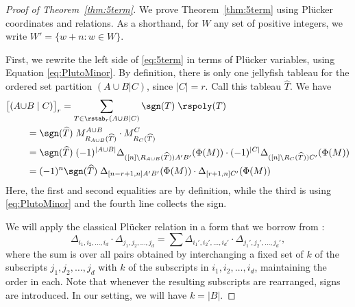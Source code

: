 \begin{proof}[Proof of Theorem~\ref{thm:5term}]
        We prove Theorem~\ref{thm:5term} using Pl\"ucker coordinates and relations. As a shorthand, for $W$ any set of positive integers, we write $W' = \{w + n : w \in W\}$.
        
    First, we rewrite the left side of \eqref{eq:5term} in terms of Pl\"ucker variables, using Equation \eqref{eq:PlutoMinor}.  By definition, there is only one jellyfish tableau for the ordered set partition $(A\cup B | C)$, since $|C|=r$. Call this tableau $\widehat{T}$.
    We have
    \begin{equation}\label{eq:expand_the_jellyfish_inv}
    \begin{split}
            \big[(A\cup & B \mid C)\big]_r = \sum_{T\in \rstab_r(A\cup B \mid C)}\sgn(T) \; \rspoly(T)  \\
          &=  \sgn(\widehat{T}) \;  M_{R_{A \cup B}(\widehat{T})}^{A \cup B} \cdot M_{R_C(\widehat{T})}^{C} \\
          &=  \sgn(\widehat{T}) \; (-1)^{|A \cup B|} \Delta_{([n]\setminus R_{A \cup B}(\widehat{T}))  A' B'}(\Phi(M)) \cdot (-1)^{|C|}\Delta_{([n]\setminus R_C(\widehat{T}))  C'}(\Phi(M))\\
          &= (-1)^n \sgn(\widehat{T}) \;  \Delta_{[n-r + 1, n]  A' B'}(\Phi(M)) \cdot \Delta_{[r+1, n]  C'}(\Phi(M))
    \end{split}
      \end{equation}
Here, the first and second equalities are by definition, while the third is using \eqref{eq:PlutoMinor} and the fourth line collects the sign.

We will apply the classical Pl\"ucker relation in a form that we borrow from \cite[Eqn.~9.1]{Fulton:YoungTableaux}:
\begin{equation}\label{eq:Fulton}
\Delta_{i_1,i_2,\ldots,i_d}\cdot\Delta_{j_1,j_2,\ldots,j_d}=\sum\Delta_{i_1',i_2',\ldots,i_d'}\cdot\Delta_{j_1',j_2',\ldots,j_d'},
\end{equation}
where the sum is over all pairs obtained by interchanging a fixed set of $k$ of the subscripts $j_1,j_2,\ldots,j_d$ with $k$ of the subscripts in $i_1,i_2,\ldots,i_d$, maintaining the order in each. Note that whenever the resulting subscripts are rearranged, signs are introduced. In our setting, we will have $k = |B|$. 


\end{proof}
